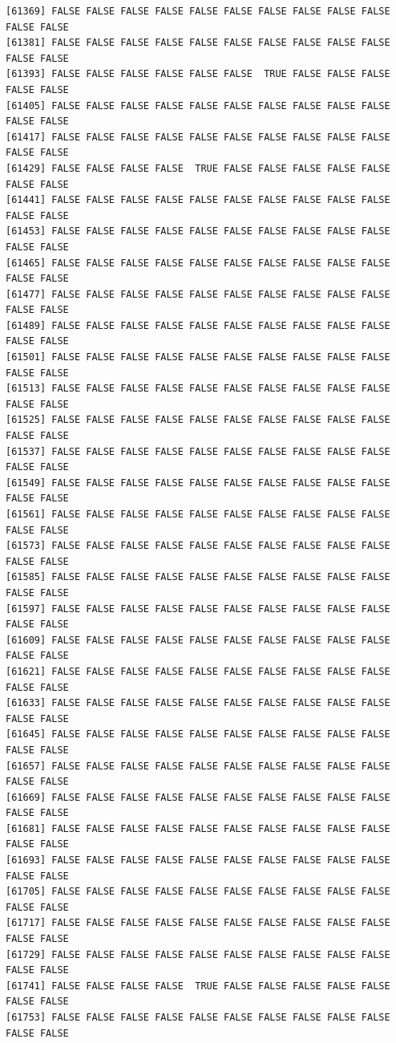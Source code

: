 \documentclass[
  a4paper,
  DIV=11,
  numbers=noendperiod]{scrartcl}
\begin{document}
\begin{verbatim}
[61369] FALSE FALSE FALSE FALSE FALSE FALSE FALSE FALSE FALSE FALSE FALSE FALSE
[61381] FALSE FALSE FALSE FALSE FALSE FALSE FALSE FALSE FALSE FALSE FALSE FALSE
[61393] FALSE FALSE FALSE FALSE FALSE FALSE  TRUE FALSE FALSE FALSE FALSE FALSE
[61405] FALSE FALSE FALSE FALSE FALSE FALSE FALSE FALSE FALSE FALSE FALSE FALSE
[61417] FALSE FALSE FALSE FALSE FALSE FALSE FALSE FALSE FALSE FALSE FALSE FALSE
[61429] FALSE FALSE FALSE FALSE  TRUE FALSE FALSE FALSE FALSE FALSE FALSE FALSE
[61441] FALSE FALSE FALSE FALSE FALSE FALSE FALSE FALSE FALSE FALSE FALSE FALSE
[61453] FALSE FALSE FALSE FALSE FALSE FALSE FALSE FALSE FALSE FALSE FALSE FALSE
[61465] FALSE FALSE FALSE FALSE FALSE FALSE FALSE FALSE FALSE FALSE FALSE FALSE
[61477] FALSE FALSE FALSE FALSE FALSE FALSE FALSE FALSE FALSE FALSE FALSE FALSE
[61489] FALSE FALSE FALSE FALSE FALSE FALSE FALSE FALSE FALSE FALSE FALSE FALSE
[61501] FALSE FALSE FALSE FALSE FALSE FALSE FALSE FALSE FALSE FALSE FALSE FALSE
[61513] FALSE FALSE FALSE FALSE FALSE FALSE FALSE FALSE FALSE FALSE FALSE FALSE
[61525] FALSE FALSE FALSE FALSE FALSE FALSE FALSE FALSE FALSE FALSE FALSE FALSE
[61537] FALSE FALSE FALSE FALSE FALSE FALSE FALSE FALSE FALSE FALSE FALSE FALSE
[61549] FALSE FALSE FALSE FALSE FALSE FALSE FALSE FALSE FALSE FALSE FALSE FALSE
[61561] FALSE FALSE FALSE FALSE FALSE FALSE FALSE FALSE FALSE FALSE FALSE FALSE
[61573] FALSE FALSE FALSE FALSE FALSE FALSE FALSE FALSE FALSE FALSE FALSE FALSE
[61585] FALSE FALSE FALSE FALSE FALSE FALSE FALSE FALSE FALSE FALSE FALSE FALSE
[61597] FALSE FALSE FALSE FALSE FALSE FALSE FALSE FALSE FALSE FALSE FALSE FALSE
[61609] FALSE FALSE FALSE FALSE FALSE FALSE FALSE FALSE FALSE FALSE FALSE FALSE
[61621] FALSE FALSE FALSE FALSE FALSE FALSE FALSE FALSE FALSE FALSE FALSE FALSE
[61633] FALSE FALSE FALSE FALSE FALSE FALSE FALSE FALSE FALSE FALSE FALSE FALSE
[61645] FALSE FALSE FALSE FALSE FALSE FALSE FALSE FALSE FALSE FALSE FALSE FALSE
[61657] FALSE FALSE FALSE FALSE FALSE FALSE FALSE FALSE FALSE FALSE FALSE FALSE
[61669] FALSE FALSE FALSE FALSE FALSE FALSE FALSE FALSE FALSE FALSE FALSE FALSE
[61681] FALSE FALSE FALSE FALSE FALSE FALSE FALSE FALSE FALSE FALSE FALSE FALSE
[61693] FALSE FALSE FALSE FALSE FALSE FALSE FALSE FALSE FALSE FALSE FALSE FALSE
[61705] FALSE FALSE FALSE FALSE FALSE FALSE FALSE FALSE FALSE FALSE FALSE FALSE
[61717] FALSE FALSE FALSE FALSE FALSE FALSE FALSE FALSE FALSE FALSE FALSE FALSE
[61729] FALSE FALSE FALSE FALSE FALSE FALSE FALSE FALSE FALSE FALSE FALSE FALSE
[61741] FALSE FALSE FALSE FALSE  TRUE FALSE FALSE FALSE FALSE FALSE FALSE FALSE
[61753] FALSE FALSE FALSE FALSE FALSE FALSE FALSE FALSE FALSE FALSE FALSE FALSE

\end{verbatim}
\end{document}
